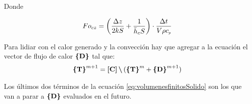 \documentclass[11pt, titlepage]{article}
\begin{document}
Donde 

\[Fo_{cz} = \left( \frac{\Delta z}{2 k S} + \frac{1}{\hc S}\right)\cdot \frac{\Delta t}{V \rho \cp}\]

Para lidiar con el calor generado y la convección hay que agregar a la ecuación el vector de flujo de calor $\Cme{D}$ tal que:
\begin{equation}\label{eq:solver}
\Cme{T}^{m+1} =    \Mme{C} \mldivide (\Cme{T}^{m} + \Cme{D}^{m+1})
\end{equation}

Los últimos dos términos de la ecuación \ref{eq:volumenesfinitosSolido} son los que van a parar a $\Cme{D}$ evaluados en el futuro.
\end{document}
